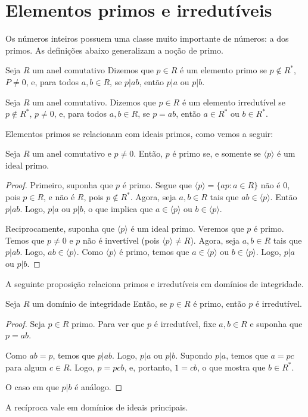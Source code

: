 \section{Elementos primos e irredutíveis}
Os números inteiros possuem uma classe muito importante de números: a dos primos.
As definições abaixo generalizam a noção de primo.

\begin{prop}
    Seja $R$ um anel comutativo
    Dizemos que $p \in R$ é um elemento primo se $p\notin R^*$, $P\neq 0$, e, para todos $a, b \in R$, se $p|ab$, então $p|a$ ou $p|b$.
\end{prop}

\begin{prop}
    Seja $R$ um anel comutativo.
    Dizemos que $p \in R$ é um elemento irredutível se $p\notin R^*$, $p\neq 0$, e, para todos $a, b \in R$, se $p=ab$, então $a\in R^*$ ou $b\in R^*$.
\end{prop}

Elementos primos se relacionam com ideais primos, como vemos a seguir:
\begin{prop}
    Seja $R$ um anel comutativo e $p\neq 0$.
    Então, $p$ é primo se, e somente se $\langle p\rangle$ é um ideal primo.
\end{prop}
\begin{proof}
    Primeiro, suponha que $p$ é primo.
    Segue que $\langle p\rangle=\{ap: a \in R\}$ não é $0$, pois $p \in R$, e não é $R$, pois $p\notin R^*$.
    Agora, seja $a, b \in R$ tais que $ab \in \langle p\rangle$.
    Então $p|ab$.
    Logo, $p|a$ ou $p|b$, o que implica que $a\in \langle p\rangle$ ou $b \in \langle p\rangle$.

    Reciprocamente, suponha que $\langle p\rangle$ é um ideal primo.
    Veremos que $p$ é primo.
    Temos que $p\neq 0$ e $p$ não é invertível (pois $\langle p\rangle\neq R$).
    Agora, seja $a, b \in R$ tais que $p|ab$.
    Logo, $ab \in \langle p\rangle$.
    Como $\langle p\rangle$ é primo, temos que $a \in \langle p\rangle$ ou $b \in \langle p\rangle$.
    Logo, $p|a$ ou $p|b$.
\end{proof}

A seguinte proposição relaciona primos e irredutíveis em domínios de integridade.

\begin{prop}
    Seja $R$ um domínio de integridade
    Então, se $p \in R$ é primo, então $p$ é irredutível.
\end{prop}
\begin{proof}
    Seja $p \in R$ primo.
    Para ver que $p$ é irredutível, fixe $a, b \in R$ e suponha que $p=ab$.
    
    Como $ab=p$, temos que $p|ab$.
    Logo, $p|a$ ou $p|b$.
    Supondo $p|a$, temos que $a=pc$ para algum $c \in R$.
    Logo, $p=pcb$, e, portanto, $1=cb$, o que mostra que $b \in R^*$.

    O caso em que $p|b$ é análogo.
\end{proof}
A recíproca vale em domínios de ideais principais.

